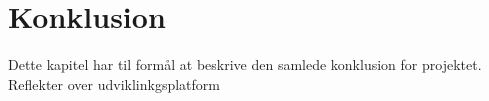 \chapter{Konklusion}
Dette kapitel har til formål at beskrive den samlede 
konklusion for projektet. \\

Reflekter over udviklinkgsplatform

